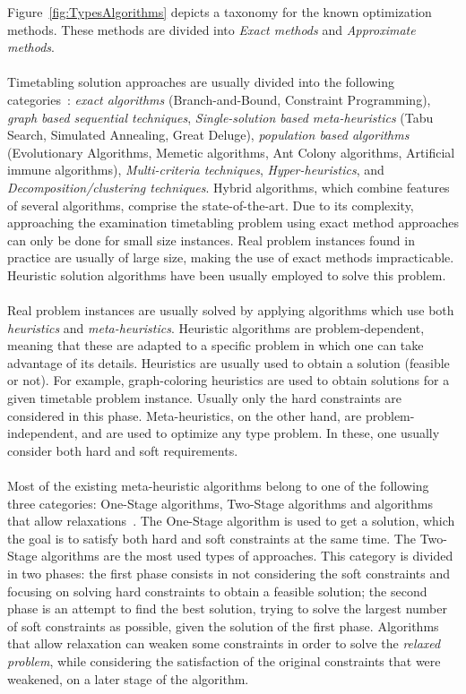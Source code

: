 Figure~\ref{fig:TypesAlgorithms} depicts a taxonomy for the known optimization methods. These methods are divided into \textit{Exact methods} and \textit{Approximate methods}.\\
\\
Timetabling solution approaches are usually divided into the following categories~\cite{Qu2009}: \textit{exact algorithms} (Branch-and-Bound, Constraint Programming), \textit{graph based sequential techniques}, \textit{Single-solution based meta-heuristics} (Tabu Search, Simulated Annealing, Great Deluge), \textit{population based algorithms} (Evolutionary Algorithms, Memetic algorithms, Ant Colony algorithms, Artificial immune algorithms), \textit{Multi-criteria techniques}, \textit{Hyper-heuristics}, and \textit{Decomposition/clustering techniques}. Hybrid algorithms, which combine features of several algorithms, comprise the state-of-the-art. Due to its complexity, approaching the examination timetabling problem using exact method approaches can only be done for small size instances. Real problem instances found in practice are usually of large size, making the use of exact methods impracticable. Heuristic solution algorithms have been usually employed to solve this problem.\\
\\
Real problem instances are usually solved by applying algorithms which use both \textit{heuristics} and \textit{meta-heuristics}. Heuristic algorithms are problem-dependent, meaning that these are adapted to a specific problem in which one can take advantage of its details. Heuristics are usually used to obtain a solution (feasible or not). For example, graph-coloring heuristics are used to obtain solutions for a given timetable problem instance. Usually only the hard constraints are considered in this phase. Meta-heuristics, on the other hand, are problem-independent, and are used to optimize any type problem. In these, one usually consider both hard and soft requirements.\\
\\
Most of the existing meta-heuristic algorithms belong to one of the following three categories: One-Stage algorithms, Two-Stage algorithms and algorithms that allow relaxations~\cite{Lewis2007}. The One-Stage algorithm is used to get a solution, which the goal is to satisfy both hard and soft constraints at the same time. The Two-Stage algorithms are the most used types of approaches. This category is divided in two phases: the first phase consists in not considering the soft constraints and focusing on solving hard constraints to obtain a feasible solution; the second phase is an attempt to find the best solution, trying to solve the largest number of soft constraints as possible, given the solution of the first phase. Algorithms that allow relaxation can weaken some constraints in order to solve the \textit{relaxed problem}, while considering the satisfaction of the original constraints that were weakened, on a later stage of the algorithm.

